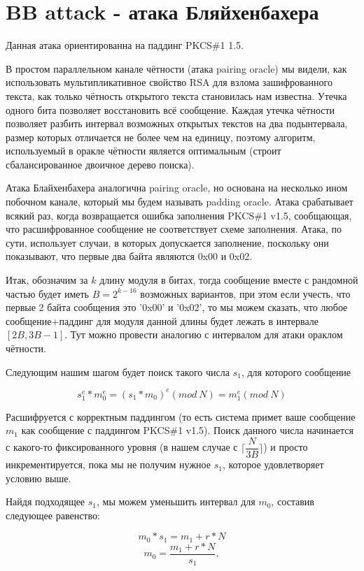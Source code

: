 \documentclass[12pt,a4paper]{scrartcl}
\begin{document}
\section{BB attack - атака Бляйхенбахера}

Данная атака ориентированна на паддинг PKCS\#1 1.5.

В простом параллельном канале чётности (атака pairing oracle) мы видели, как использовать мультипликативное свойство RSA для взлома зашифрованного текста, как только чётность открытого текста становилась нам известна. Утечка одного бита позволяет восстановить всё сообщение.  Каждая утечка чётности позволяет разбить интервал возможных открытых текстов на два подынтервала, размер которых отличается не более чем на единицу, поэтому алгоритм, используемый в оракле чётности является оптимальным (строит сбалансированное двоичное дерево поиска).

Атака Блайхенбахера аналогична pairing oracle, но основана на несколько ином побочном канале, который мы будем называть padding oracle. Атака срабатывает всякий раз, когда возвращается ошибка заполнения PKCS\#1 v1.5, сообщающая, что расшифрованное сообщение не соответствует схеме заполнения. Атака, по сути, использует случаи, в которых допускается заполнение, поскольку они показывают, что первые два байта являются 0x00 и 0x02.

Итак, обозначим за $k$ длину модуля в битах, тогда сообщение вместе с рандомной частью будет иметь $B=2^{k-16}$ возможных вариантов, при этом если учесть, что первые 2 байта сообщения это '0x00' и '0x02', то мы можем сказать, что любое сообщение+паддинг для модуля данной длины будет лежать в интервале $[2B,3B-1]$. Тут можно провести аналогию с интервалом для атаки ораклом чётности.

Следующим нашим шагом будет поиск такого числа $s_1$, для которого сообщение 

$$s_1^e*m_0^e=(s_1*m_0)^e(mod\ N) = m_1^e(mod\ N)$$

Расшифруется с корректным паддингом (то есть система примет ваше сообщение $m_1$ как сообщение с паддингом PKCS\#1 v1.5). Поиск данного числа начинается с какого-то фиксированного уровня (в нашем случае с $\lceil \dfrac{N}{3B}\rceil$) и просто инкрементируется, пока мы не получим нужное $s_1$, которое удовлетворяет условию выше.

Найдя подходящее $s_1$, мы можем уменьшить интервал для $m_0$, составив следующее равенство:

$$m_0*s_1=m_1+r*N$$
$$m_0=\dfrac{m_1+r*N}{s_1},$$
\end{document}
